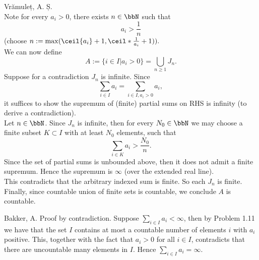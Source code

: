 \begin{solution}[1.11]{Vrămuleț, A. Ș.}\\
Note for every $a_i > 0$, there exists $n \in \bbN$ such that
\[a_i > \frac{1}{n}\] (choose $n := \max(\ceil{a_i} + 1, \ceil*{\frac{1}{a_i}} + 1)).$\\
We can now define  	
\[
A := \{i \in I | a_i > 0 \} = \bigcup_{n \geq 1} J_n.
\]
Suppose for a contradiction $J_n$ is infinite. Since 
\[
\sum_{i \in I} a_i = \sum_{i \in I, a_i > 0} a_i,
\]
it suffices to show the supremum of (finite) partial sums on RHS is infinity (to derive a contradiction). \\
Let $n \in \bbN$. Since $J_n$ is infinite, then for every $N_0 \in \bbN$ we may choose a finite subset $K \subset I$ with at least $N_0$ elements, such that
\[
\sum_{i \in K} a_i > \frac{N_0}{n}. 
\]
Since the set of partial sums is unbounded above, then it does not admit a finite supremum. Hence the supremum is $\infty$ (over the extended real line).\\
This contradicts that the arbitrary indexed sum is finite. So each $J_n$ is finite.\\
Finally, since countable union of finite sets is countable, we conclude $A$ is countable.

\end{solution}

\begin{solution}[1.12]{Bakker, A.}
	Proof by contradiction. Suppose $\sum_{i\in I}a_i < \infty$, then by Problem 1.11 we have that the set $I$ contains at most a countable number of elements $i$ with $a_i$ positive. This, together with the fact that $a_i>0$ for all $i\in I$, contradicts that there are uncountable many elements in $I$. Hence  $\sum_{i\in I}a_i = \infty$.
\end{solution}

